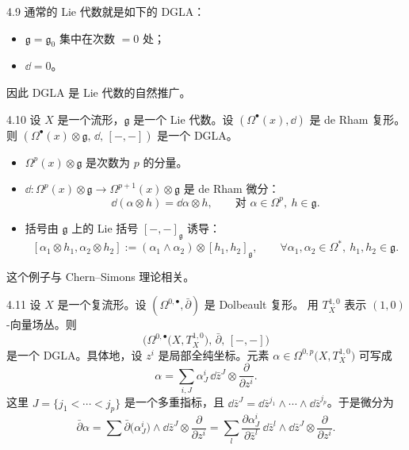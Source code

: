 \begin{wexam}{4.9}
  通常的 Lie 代数就是如下的 DGLA：
  \begin{itemize}[leftmargin=1.6em,itemsep=0.2em]
    \item $\mathfrak g=\mathfrak g_0$ 集中在次数 $=0$ 处；
    \item $\dd=0$。
  \end{itemize}
  因此 DGLA 是 Lie 代数的自然推广。
\end{wexam}

\begin{wexam}{4.10}
  设 $X$ 是一个流形，$\mathfrak g$ 是一个 Lie 代数。设 $(\Omega^{\bullet}(x),\dd)$ 是
  de Rham 复形。则 $(\Omega^{\bullet}(x)\otimes\mathfrak g,\,\dd,\,[-,-])$ 是一个 DGLA。
  \begin{itemize}[leftmargin=1.6em,itemsep=0.2em]
    \item $\Omega^{p}(x)\otimes\mathfrak g$ 是次数为 $p$ 的分量。
    \item $\dd:\Omega^{p}(x)\otimes\mathfrak g\to\Omega^{p+1}(x)\otimes\mathfrak g$ 是
          de Rham 微分：
          \[
            \dd(\alpha\otimes h)=\dd\alpha\otimes h,
            \qquad\text{对 } \alpha\in\Omega^{p},\ h\in\mathfrak g.
          \]
    \item 括号由 $\mathfrak g$ 上的 Lie 括号 $[-,-]_{\mathfrak g}$ 诱导：
          \[
            [\alpha_1\otimes h_1,\alpha_2\otimes h_2]
            :=(\alpha_1\wedge\alpha_2)\otimes[h_1,h_2]_{\mathfrak g},
            \qquad\forall\alpha_1,\alpha_2\in\Omega^{*},\ h_1,h_2\in\mathfrak g.
          \]
  \end{itemize}
  这个例子与 Chern--Simons 理论相关。
\end{wexam}

\begin{wexam}{4.11}
  设 $X$ 是一个复流形。设 $(\Omega^{0,\bullet},\bar\partial)$ 是 Dolbeault 复形。
  用 $T^{1,0}_X$ 表示 $(1,0)$-向量场丛。则
  \[
    \bigl(\Omega^{0,\bullet}\bigl(X,T^{1,0}_X\bigr),\,
    \bar\partial,\,[-,-]\bigr)
  \]
  是一个 DGLA。具体地，设 $z^i$ 是局部全纯坐标。元素
  $\alpha\in\Omega^{0,p}\bigl(X,T^{1,0}_X\bigr)$ 可写成
  \[
    \alpha=\sum_{i,J}\alpha^{i}_{J}\,\dd\bar z^{J}\otimes
    \frac{\partial}{\partial z^{i}}.
  \]
  这里 $J=\{j_1<\cdots<j_p\}$ 是一个多重指标，且
  $\dd\bar z^{J}=\dd\bar z^{j_1}\wedge\cdots\wedge \dd\bar z^{j_p}$。于是微分为
  \[
    \bar\partial\alpha
    =\sum\bar\partial\bigl(\alpha^{i}_{J}\bigr)\wedge \dd\bar z^{J}\otimes
    \frac{\partial}{\partial z^{i}}
    =\sum_{l}\frac{\partial\alpha^{i}_{J}}{\partial\bar z^{l}}\,
    \dd\bar z^{l}\wedge \dd\bar z^{J}\otimes\frac{\partial}{\partial z^{i}}.
  \]
\end{wexam}

